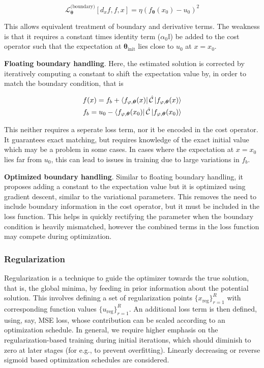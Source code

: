 \documentclass[11pt,a4paper]{article}
\begin{document}
{$$
\mathcal{L}^{\text{(boundary)}}_{\boldsymbol{\theta}} [d_x f, f, x] = \eta \left( f_{\boldsymbol{\theta}}(x_0) - u_0 \right)^2
$$

This allows equivalent treatment of boundary and derivative terms. The weakness is that it requires a constant times identity term ($\alpha_0\mathbb{I}$) be added to the cost operator such that the expectation at $\boldsymbol{\theta}_\text{init}$ lies close to $u_0$ at $x = x_0$.

\textbf{Floating boundary handling}. Here, the estimated solution is corrected by iteratively computing a constant to shift the expectation value by, in order to match the boundary condition, that is

\begin{align*}
f(x) = f_b + \bra{f_{\varphi, \boldsymbol{\theta}}(x)} \mathcal{\hat{C}} \ket{f_{\varphi, \boldsymbol{\theta}}(x)}
\\
f_b = u_0 - \bra{f_{\varphi, \boldsymbol{\theta}}(x_0)} \mathcal{\hat{C}} \ket{f_{\varphi, \boldsymbol{\theta}}(x_0)}
\end{align*}

This neither requires a seperate loss term, nor it be encoded in the cost operator. It guarantees exact matching, but requires knowledge of the exact initial value which may be a problem in some cases. In cases where the expectation at $x = x_0$ lies far from $u_0$, this can lead to issues in training due to large variations in $f_b$.

\textbf{Optimized boundary handling}. Similar to floating boundary handling, it proposes adding a constant to the expectation value but it is optimized using gradient descent, similar to the variational parameters. This removes the need to include boundary information in the cost operator, but it must be included in the loss function. This helps in quickly rectifying the parameter when the boundary condition is heavily mismatched, however the combined terms in the loss function may compete during optimization.

\subsubsection{Regularization}

Regularization is a technique to guide the optimizer towards the true solution, that is, the global minima, by feeding in prior information about the potential solution. This involves defining a set of regularization points $\{ x_\text{reg} \}_{r=1}^R$ with corresponding function values $\{ u_\text{reg} \}_{r=1}^R$. An additional loss term is then defined, using, say, MSE loss, whose contribution can be scaled according to an optimization schedule. In general, we require higher emphasis on the regularization-based training during initial iterations, which should diminish to zero at later stages (for e.g., to prevent overfitting). Linearly decreasing or reverse sigmoid based optimization schedules are considered.

}
\end{document}
